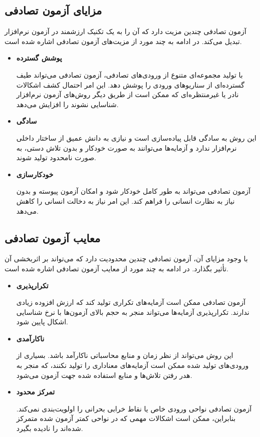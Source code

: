 \subsection{مزایای آزمون تصادفی}
آزمون تصادفی چندین مزیت دارد که آن را به یک تکنیک ارزشمند در آزمون نرم‌افزار تبدیل می‌کند. در ادامه به چند مورد از مزیت‌های آزمون تصادفی اشاره شده است.
\begin{itemize}
	\item \textbf{پوشش گسترده}
	
	با تولید مجموعه‌ای متنوع از ورودی‌های تصادفی، آزمون تصادفی می‌تواند طیف گسترده‌ای از سناریوهای ورودی را پوشش دهد. این امر احتمال کشف اشکالات نادر یا غیرمنتظره‌ای که ممکن است از طریق دیگر روش‌های آزمون نرم‌افزار شناسایی نشوند را افزایش می‌دهد.
	\item \textbf{سادگی}
	
	 این روش به سادگی قابل پیاده‌سازی است و نیازی به دانش عمیق از ساختار داخلی نرم‌افزار ندارد و آزمایه‌ها می‌توانند به صورت خودکار و بدون تلاش دستی، به صورت نامحدود تولید شوند.
	\item \textbf{خودکارسازی}
	
	 آزمون تصادفی می‌تواند به طور کامل خودکار شود و امکان آزمون پیوسته و بدون نیاز به نظارت انسانی را فراهم کند. این امر نیاز به دخالت انسانی را کاهش می‌دهد.

\end{itemize}

\subsection{معایب آزمون تصادفی}
با وجود مزایای آن، آزمون تصادفی چندین محدودیت دارد که می‌تواند بر اثربخشی آن تأثیر بگذارد. در ادامه به چند مورد از معایب آزمون تصادفی اشاره شده است.
\begin{itemize}
	\item \textbf{تکرارپذیری}
	
	آزمون تصادفی ممکن است آزمایه‌های تکراری تولید کند که ارزش افزوده زیادی ندارند. تکرارپذیری آزمایه‌ها می‌تواند منجر به حجم بالای آزمون‌ها با نرخ شناسایی اشکال پایین شود.
	\item \textbf{ناکارآمدی}
	
	 این روش می‌تواند از نظر زمان و منابع محاسباتی ناکارآمد باشد. بسیاری از ورودی‌های تولید شده ممکن است آزمایه‌های معناداری را تولید نکنند، که منجر به هدر رفتن تلاش‌ها و منابع استفاده شده جهت آزمون می‌شود.
	\item \textbf{تمرکز محدود}
	
	 آزمون تصادفی نواحی ورودی خاص یا نقاط خرابی بحرانی را اولویت‌بندی نمی‌کند. بنابراین، ممکن است اشکالات مهمی که در نواحی کمتر آزمون شده متمرکز شده‌اند را نادیده بگیرد.
\end{itemize}

